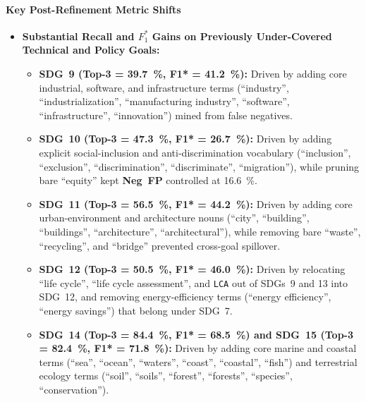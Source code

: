\paragraph{Key Post-Refinement Metric Shifts}
\begin{itemize}
  \item \textbf{Substantial Recall and $F_1^*$ Gains on Previously Under-Covered Technical and Policy Goals:}
  \begin{itemize}
    \item \textbf{\gls{SDG}~9 (\textbf{Top-3} = \qty{39.7}{\percent}, \textbf{F1*} = \qty{41.2}{\percent}):} Driven by adding core industrial, software, and infrastructure terms (\enquote{industry}, \enquote{industrialization}, \enquote{manufacturing industry}, \enquote{software}, \enquote{infrastructure}, \enquote{innovation}) mined from false negatives.
    
    \item \textbf{\gls{SDG}~10 (\textbf{Top-3} = \qty{47.3}{\percent}, \textbf{F1*} = \qty{26.7}{\percent}):} Driven by adding explicit social-inclusion and anti-discrimination vocabulary (\enquote{inclusion}, \enquote{exclusion}, \enquote{discrimination}, \enquote{discriminate}, \enquote{migration}), while pruning bare \enquote{equity} kept \textbf{Neg~FP} controlled at \qty{16.6}{\percent}.
    
    \item \textbf{\gls{SDG}~11 (\textbf{Top-3} = \qty{56.5}{\percent}, \textbf{F1*} = \qty{44.2}{\percent}):} Driven by adding core urban-environment and architecture nouns (\enquote{city}, \enquote{building}, \enquote{buildings}, \enquote{architecture}, \enquote{architectural}), while removing bare \enquote{waste}, \enquote{recycling}, and \enquote{bridge} prevented cross-goal spillover.
    
    \item \textbf{\gls{SDG}~12 (\textbf{Top-3} = \qty{50.5}{\percent}, \textbf{F1*} = \qty{46.0}{\percent}):} Driven by relocating \enquote{life cycle}, \enquote{life cycle assessment}, and \texttt{LCA} out of \glspl{SDG}~9 and 13 into \gls{SDG}~12, and removing energy-efficiency terms (\enquote{energy efficiency}, \enquote{energy savings}) that belong under \gls{SDG}~7.
    
    \item \textbf{\gls{SDG}~14 (\textbf{Top-3} = \qty{84.4}{\percent}, \textbf{F1*} = \qty{68.5}{\percent}) and \gls{SDG}~15 (\textbf{Top-3} = \qty{82.4}{\percent}, \textbf{F1*} = \qty{71.8}{\percent}):} Driven by adding core marine and coastal terms (\enquote{sea}, \enquote{ocean}, \enquote{waters}, \enquote{coast}, \enquote{coastal}, \enquote{fish}) and terrestrial ecology terms (\enquote{soil}, \enquote{soils}, \enquote{forest}, \enquote{forests}, \enquote{species}, \enquote{conservation}).
  \end{itemize}


\end{itemize}
